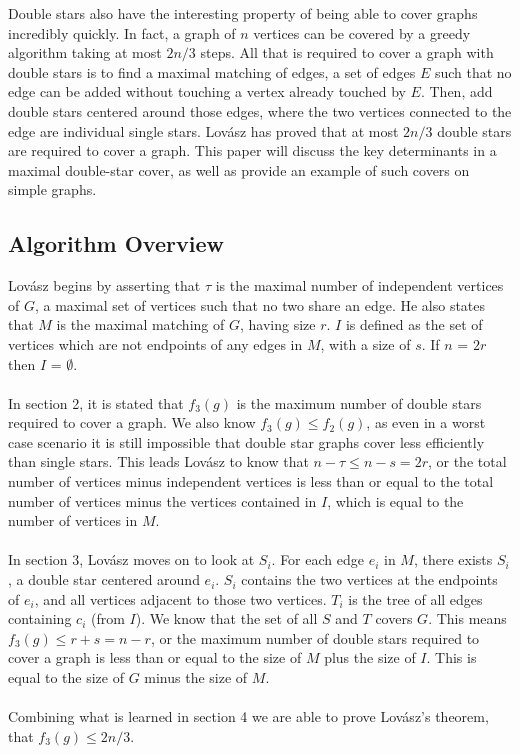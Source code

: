 \documentclass{article}
\begin{document}
	Double stars also have the interesting property of being able to cover graphs incredibly quickly. In fact, a graph of $n$ vertices can be covered by a greedy algorithm taking at most $2n/3$ steps. All that is required to cover a graph with double stars is to find a maximal matching of edges, a set of edges $E$ such that no edge can be added without touching a vertex already touched by $E$. Then, add double stars centered around those edges, where the two vertices connected to the edge are individual single stars. Lov\'asz has proved that at most $2n/3$ double stars are required to cover a graph. This paper will discuss the key determinants in a maximal double-star cover, as well as provide an example of such covers on simple graphs.
	\subsection{Algorithm Overview}
	
	Lov\'asz begins by asserting that $\tau$ is the maximal number of independent vertices of $G$, a maximal set of vertices such that no two share an edge. He also states that $M$ is the maximal matching of $G$, having size $r$. $I$ is defined as the set of vertices which are not endpoints of any edges in $M$, with a size of $s$. If $n$ = $2r$ then $I$ = $\emptyset$.
	\\\\
	In section 2, it is stated that $f_{3}(g)$ is the maximum number of double stars required to cover a graph. We also know $f_{3}(g) \leq f_{2}(g)$, as even in a worst case scenario it is still impossible that double star graphs cover less efficiently than single stars. This leads Lov\'asz to know that $n-\tau \leq n-s = 2r$, or the total number of vertices minus independent vertices is less than or equal to the total number of vertices minus the vertices contained in $I$, which is equal to the number of vertices in $M$.
	\\\\
	In section 3, Lov\'asz moves on to look at $S_{i}$. For each edge $e_{i}$ in $M$, there exists $S_{i}$, a double star centered around $e_{i}$. $S_{i}$ contains the two vertices at the endpoints of $e_{i}$, and all vertices adjacent to those two vertices. $T_{i}$ is the tree of all edges containing $c_{i}$ (from $I$). We know that the set of all $S$ and $T$ covers $G$. This means $f_{3}(g) \leq r + s = n - r$, or the maximum number of double stars required to cover a graph is less than or equal to the size of $M$ plus the size of $I$. This is equal to the size of $G$ minus the size of $M$.
	\\\\
	Combining what is learned in section 4 we are able to prove Lov\'asz's theorem, that $f_{3}(g) \leq 2n/3$.
	
\end{document}
